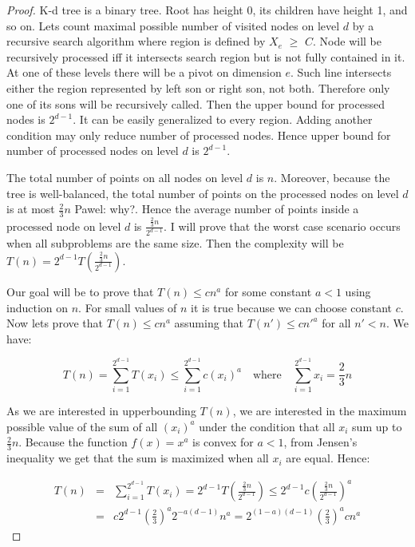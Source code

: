 \documentclass[10pt,a4paper]{article}
\newcommand{\pawel}[1]{\noindent\colorbox{myRed}{Pawel: #1}}
\begin{document}
\begin{proof}

K-d tree is a binary tree. Root has height 0, its children have height 1, and so on. Lets count maximal possible number of visited nodes on level $d$ by a recursive search algorithm where region is defined by $X_e$ $\geq$ $C$. Node will be recursively processed iff it intersects search region but is not fully contained in it. At one of these levels there will be a pivot on dimension $e$. Such line intersects either the region represented by left son or right son, not both. Therefore only one of its sons will be recursively called. Then the upper bound for processed nodes is $2^{d-1}$. It can be easily generalized to every region. Adding another condition may only reduce number of processed nodes. Hence upper bound for number of processed nodes on level $d$ is $2^{d-1}$. 

The total number of points on all nodes on level $d$ is $n$. Moreover, because the tree is well-balanced, the total number of points on the processed nodes on level $d$ is at most $\frac{2}{3}n$ \pawel{why?}. Hence the average number of points inside a processed node on level $d$ is $\frac{\frac{2}{3}n}{2^{d-1}}$. I will prove that the worst case scenario occurs when all subproblems are the same size. Then the complexity will be $T(n)=2^{d-1}T(\frac{\frac{2}{3}n}{2^{d-1}})$.

Our goal will be to prove that $T(n) \leq c n^a$ for some constant $a < 1$ using induction on $n$. For small values of $n$ it is true because we can choose constant $c$. Now lets prove that $T(n) \leq c n^a$ assuming that $T(n') \leq c n'^a$ for all $n'<n$. We have:

$$T(n) = \displaystyle\sum\limits_{i=1}^{2^{d-1}} T(x_i)\leq\displaystyle\sum\limits_{i=1}^{2^{d-1}} c(x_i)^{a}  \quad\text{where}\quad  \displaystyle\sum\limits_{i=1}^{2^{d-1}} x_i = \frac{2}{3}n$$ 

As we are interested in upperbounding $T(n)$, we are interested in the maximum possible value of the sum of all $(x_i)^{a}$ under the condition that all $x_{i}$ sum up to $\frac{2}{3}n$. Because the function $f(x)=x^{a}$ is convex for $a<1$, from Jensen's inequality we get that the sum is maximized when all $x_{i}$ are equal. Hence:

\begin{eqnarray*}
T(n) &=& \displaystyle\sum\limits_{i=1}^{2^{d-1}} T(x_i) = 2^{d-1} T\left(\frac{\frac{2}{3}n}{2^{d-1}}\right) \leq 2^{d-1} c \left(\frac{\frac{2}{3}n}{2^{d-1}}\right) ^ a  \\
& = & c 2^{d-1} \left(\frac{2}{3}\right)^a 2^{-a(d-1)} n^a = 2^{(1-a)(d-1)} \left(\frac{2}{3}\right)^a c n^a
\end{eqnarray*}


\end{proof}
\end{document}
